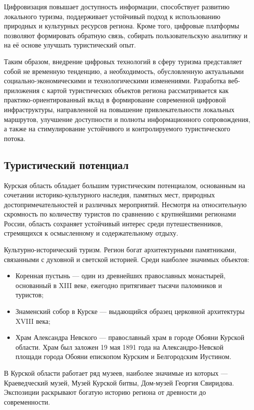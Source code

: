 Цифровизация повышает доступность информации, способствует развитию локального туризма, поддерживает устойчивый подход к использованию природных и культурных ресурсов региона\cite{b2}. Кроме того, цифровые платформы позволяют формировать обратную связь, собирать пользовательскую аналитику и на её основе улучшать туристический опыт.

Таким образом, внедрение цифровых технологий в сферу туризма представляет собой не временную тенденцию, а необходимость, обусловленную актуальными социально-экономическими и технологическими изменениями. Разработка веб-приложения с картой туристических объектов региона рассматривается как практико-ориентированный вклад в формирование современной цифровой инфраструктуры, направленной на повышение привлекательности локальных маршрутов, улучшение доступности и полноты информационного сопровождения, а также на стимулирование устойчивого и контролируемого туристического потока.

\subsection{Туристический потенциал}

Курская область обладает большим туристическим потенциалом, основанным на сочетании историко-культурного наследия, памятных мест, природных достопримечательностей и различных мероприятий. Несмотря на относительную скромность по количеству туристов по сравнению с крупнейшими регионами России, область сохраняет устойчивый интерес среди путешественников, стремящихся к осмысленному и содержательному отдыху.

Культурно-исторический туризм.
Регион богат архитектурными памятниками, связанными с духовной и светской историей. Среди наиболее значимых объектов:
\begin{itemize}
	\item Коренная пустынь — один из древнейших православных монастырей, основанный в XIII веке, ежегодно притягивает тысячи паломников и туристов;
	\item Знаменский собор в Курске — выдающийся образец церковной архитектуры XVIII века;
	\item Храм Александра Невского — православный храм в городе Обояни Курской области. Храм был заложен 19 мая 1891 года на Александро-Невской площади города Обояни епископом Курским и Белгородским Иустином.
\end{itemize}

В Курской области работает ряд музеев, наиболее значимые из которых — Краеведческий музей, Музей Курской битвы, Дом-музей Георгия Свиридова. Экспозиции раскрывают богатую историю региона от древности до современности.

